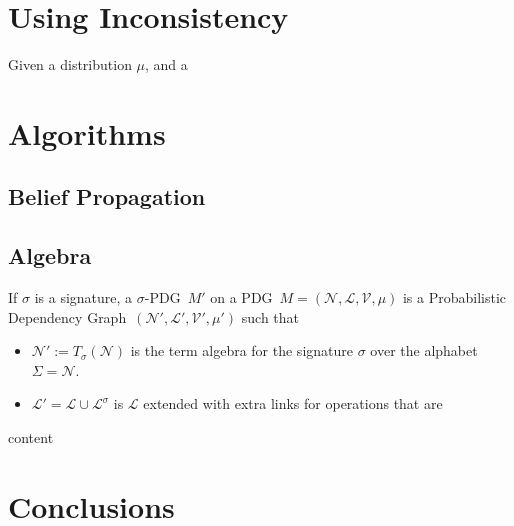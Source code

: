 \documentclass{article}
\newcommand{\modelname}{Probabilistic Dependency Graph}
\newcommand{\MN}{PDG}
\begin{document}
	\section{Using Inconsistency}

	Given a distribution $\mu$, and a

	\section{Algorithms}
	\subsection{Belief Propagation}


	\begin{vcat}
		\section{Algebra}\label{sec:algebra}
		\begin{defn}
			If $\sigma$ is a signature, a $\sigma$-\MN\ $M'$ on a \MN\ $M=(\mathcal N, \mathcal L, \mathcal V, \mu)$ is a \modelname\ $(\mathcal N', \mathcal L', \mathcal V', \mu')$ such that
			\begin{itemize}
				\item $\mathcal N':= T_\sigma(\mathcal N)$ is the term algebra for the signature $\sigma$ over the alphabet $\Sigma = \mathcal N$.
				\item $\mathcal L' = \mathcal L \cup \mathcal L^\sigma$ is $\mathcal L$ extended with extra links for operations that are 
			\end{itemize}
		\end{defn}
		
		\begin{example}
			content
		\end{example}
		
	\end{vcat}
	\section{Conclusions}
\end{document}
